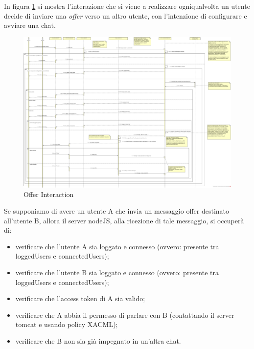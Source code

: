 In figura \ref{gfx:offerinteraction} si mostra l'interazione che si viene a realizzare ogniqualvolta un utente decide di inviare una \textit{offer} verso un altro utente, con l'intenzione di configurare e avviare una chat.

\begin{landscape}
\begin{center}
\begin{figure}[!htbp]
	\centering
	\includegraphics[scale = .25]{img/sequence_offer.png}
	\caption{Offer Interaction}
	\label{gfx:offerinteraction}
\end{figure}
\end{center}	
\end{landscape}%
Se supponiamo di avere un utente A che invia un messaggio offer destinato all'utente B, allora il server nodeJS, alla ricezione di tale messaggio, si occuperà di:
\begin{itemize}
\item verificare che l'utente A sia loggato e connesso (ovvero: presente tra loggedUsers e connectedUsers);
\item verificare che l'utente B sia loggato e connesso (ovvero: presente tra loggedUsers e connectedUsers);
\item verificare che l'access token di A sia valido;
\item verificare che A abbia il permesso di parlare con B (contattando il server tomcat e usando policy XACML);
\item verificare che B non sia già impegnato in un'altra chat.
\end{itemize}

